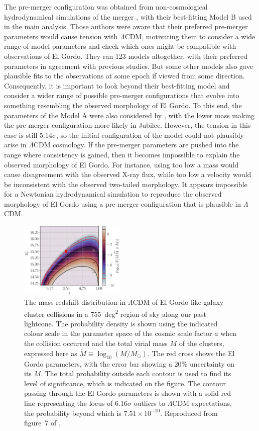 \documentclass[fleqn,usenatbib,useAMS]{mnras} %
\begin{document}
The pre-merger configuration was obtained from non-cosmological hydrodynamical simulations of the merger \citep{Zhang_2015}, with their best-fitting Model B used in the main analysis. Those authors were aware that their preferred pre-merger parameters would cause tension with $\Lambda$CDM, motivating them to consider a wide range of model parameters and check which ones might be compatible with observations of El Gordo. They ran 123 models altogether, with their preferred parameters in agreement with previous studies. But some other models also gave plausible fits to the observations at some epoch if viewed from some direction. Consequently, it is important to look beyond their best-fitting model and consider a wider range of possible pre-merger configurations that evolve into something resembling the observed morphology of El Gordo. To this end, the parameters of the \citet{Zhang_2015} Model A were also considered by \citet{Asencio_2021}, with the lower mass making the pre-merger configuration more likely in Jubilee. However, the tension in this case is still $5.14\sigma$, so the initial configuration of the model could not plausibly arise in $\Lambda$CDM cosmology. If the pre-merger parameters are pushed into the range where consistency is gained, then it becomes impossible to explain the observed morphology of El Gordo. For instance, using too low a mass would cause disagreement with the observed X-ray flux, while too low a velocity would be inconsistent with the observed two-tailed morphology. It appears impossible for a Newtonian hydrodynamical simulation to reproduce the observed morphology of El Gordo using a pre-merger configuration that is plausible in $\Lambda$CDM.

\begin{figure}
	\centering
	\includegraphics[width=0.45\textwidth]{Asencio_2021_Figure_7}
	\caption{The mass-redshift distribution  in $\Lambda$CDM of El Gordo-like galaxy cluster collisions in a 755~deg\textsuperscript{2} region of sky along our past lightcone. The probability density is shown using the indicated colour scale in the parameter space of the cosmic scale factor $a$ when the collision occurred and the total virial mass $M$ of the clusters, expressed here as $\widetilde{M} \equiv \log_{10} \left( M/M_\odot \right)$. The red cross shows the El Gordo parameters, with the error bar showing a 20\% uncertainty on its $M$. The total probability outside each contour is used to find its level of significance, which is indicated on the figure. The contour passing through the El Gordo parameters is shown with a solid red line representing the locus of $6.16\sigma$ outliers to $\Lambda$CDM expectations, the probability beyond which is $7.51 \times 10^{-10}$. Reproduced from figure~7 of \citet{Asencio_2021}.}
	\label{Asencio_2021_Figure_7}
\end{figure}
\end{document}
